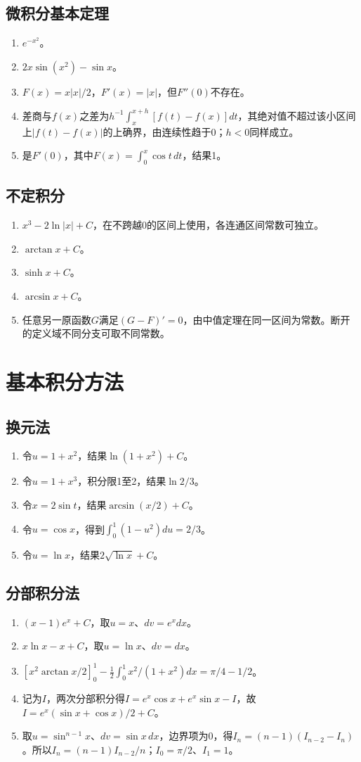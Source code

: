 \documentclass[11pt,a4paper,fontset=fandol]{ctexrep}
\begin{document}
\subsection{微积分基本定理}
\begin{enumerate}
\item $e^{-x^2}$。
\item $2x\sin(x^2)-\sin x$。
\item $F(x)=x|x|/2$，$F'(x)=|x|$，但$F''(0)$不存在。
\item 差商与$f(x)$之差为$h^{-1}\int_x^{x+h}[f(t)-f(x)]dt$，其绝对值不超过该小区间上$|f(t)-f(x)|$的上确界，由连续性趋于0；$h<0$同样成立。
\item 是$F'(0)$，其中$F(x)=\int_0^x\cos t\,dt$，结果1。
\end{enumerate}
\subsection{不定积分}
\begin{enumerate}
\item $x^3-2\ln|x|+C$，在不跨越0的区间上使用，各连通区间常数可独立。
\item $\arctan x+C$。
\item $\sinh x+C$。
\item $\arcsin x+C$。
\item 任意另一原函数$G$满足$(G-F)'=0$，由中值定理在同一区间为常数。断开的定义域不同分支可取不同常数。
\end{enumerate}
\section{基本积分方法}
\subsection{换元法}
\begin{enumerate}
\item 令$u=1+x^2$，结果$\ln(1+x^2)+C$。
\item 令$u=1+x^3$，积分限1至2，结果$\ln2/3$。
\item 令$x=2\sin t$，结果$\arcsin(x/2)+C$。
\item 令$u=\cos x$，得到$\int_0^1(1-u^2)du=2/3$。
\item 令$u=\ln x$，结果$2\sqrt{\ln x}+C$。
\end{enumerate}
\subsection{分部积分法}
\begin{enumerate}
\item $(x-1)e^x+C$，取$u=x$、$dv=e^x dx$。
\item $x\ln x-x+C$，取$u=\ln x$、$dv=dx$。
\item $[x^2\arctan x/2]_0^1-\frac12\int_0^1x^2/(1+x^2)dx=\pi/4-1/2$。
\item 记为$I$，两次分部积分得$I=e^x\cos x+e^x\sin x-I$，故$I=e^x(\sin x+\cos x)/2+C$。
\item 取$u=\sin^{n-1}x$、$dv=\sin x\,dx$，边界项为0，得$I_n=(n-1)(I_{n-2}-I_n)$。所以$I_n=(n-1)I_{n-2}/n$；$I_0=\pi/2$、$I_1=1$。
\end{enumerate}
\end{document}
